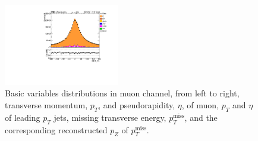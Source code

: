 \begin{figure}
  \includegraphics[width=0.45\textwidth]{fig/app4/muon/MET_Pz.pdf}
  \caption{Basic variables distributions in muon channel, from left to right, transverse momentum, $p_{T}$, and pseudorapidity, $\eta$, of muon, $p_{T}$ and $\eta$ of leading $p_{T}$ jets, missing transverse energy, $p_{T}^{\text{miss}}$, and the corresponding reconstructed $p_{Z}$ of $p_{T}^{\text{miss}}$.}
  \label{Fig:DataMCMuon1}
  \end{figure}

